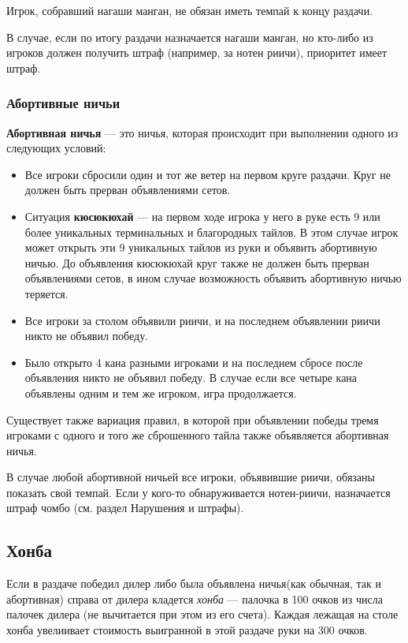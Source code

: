 \begin{additional}
Игрок, собравший нагаши манган, не обязан иметь темпай к концу раздачи.

В случае, если по итогу раздачи назначается нагаши манган, но кто-либо из игроков должен получить штраф (например, за нотен риичи), приоритет имеет штраф. 



\subsubsection{Абортивные ничьи}
\textbf{Абортивная ничья} --- это ничья, которая происходит при выполнении одного из следующих условий:
\begin{itemize}
	\item Все игроки сбросили один и тот же ветер на первом круге раздачи. Круг не должен быть прерван объявлениями сетов.
	\item Ситуация \textbf{кюсюкюхай} --- на первом ходе игрока у него в руке есть 9 или более уникальных терминальных и благородных тайлов. В этом случае игрок может открыть эти 9 уникальных тайлов из руки и объявить абортивную ничью. До объявления кюсюкюхай круг также не должен быть прерван объявлениями сетов, в ином случае возможность объявить абортивную ничью теряется.
	\item Все игроки за столом объявили риичи, и на последнем объявлении риичи никто не объявил победу.
	\item Было открыто 4 кана разными игроками и на последнем сбросе после объявления никто не объявил победу. В случае если все четыре кана объявлены одним и тем же игроком, игра продолжается.
\end{itemize}	
	
	Существует также вариация правил, в которой при объявлении победы тремя игроками с одного и того же сброшенного тайла также объявляется абортивная ничья.

В случае любой абортивной ничьей все игроки, объявившие риичи, обязаны показать свой темпай. Если у кого-то обнаруживается нотен-риичи, назначается штраф чомбо (см. раздел Нарушения и штрафы).

\end{additional}

	
	



\subsection{Хонба}

Если в раздаче победил дилер либо была объявлена  ничья(как обычная, так и абортивная) справа от дилера кладется \textit{хонба} --- палочка в 100 очков из числа палочек дилера (не вычитается при этом из его счета).  Каждая лежащая на столе хонба увелиивает стоимость выигранной в этой раздаче руки на 300 очков.

